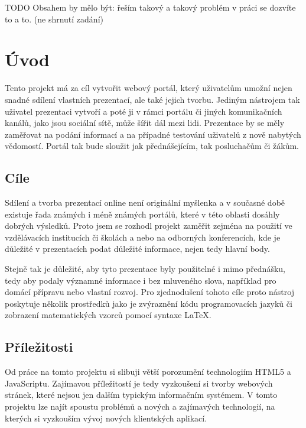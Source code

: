 \documentclass[11pt,twoside,a4paper]{book}
\begin{document}

	\baselineskip

	\noindent
	TODO Obsahem by mělo být: řeším takový a takový problém v práci se dozvíte to a to. (ne shrnutí zadání)

	\tableofcontents		%

	\listoffigures			%

	\mainbodystarts



\chapter{Úvod}
Tento projekt má za cíl vytvořit webový portál, který uživatelům umožní nejen snadné sdílení vlastních prezentací, ale také jejich tvorbu. Jediným nástrojem tak uživatel prezentaci vytvoří a poté ji v rámci portálu či jiných komunikačních kanálů, jako jsou sociální sítě, může šířit dál mezi lidi. Prezentace by se měly zaměřovat na podání informací a na případné testování uživatelů z nově nabytých vědomostí. Portál tak bude sloužit jak přednášejícím, tak posluchačům či žákům.

\section{Cíle}
Sdílení a tvorba prezentací online není originální myšlenka a v současné době existuje řada známých i méně známých portálů, které v této oblasti dosáhly dobrých výsledků. Proto jsem se rozhodl projekt zaměřit zejména na použití ve vzdělávacích institucích či školách a nebo na odborných konferencích, kde je důležité v prezentacích podat důležité informace, nejen tedy hlavní body.

Stejně tak je důležité, aby tyto prezentace byly použitelné i mimo přednášku, tedy aby podaly významné informace i bez mluveného slova, například pro domácí přípravu nebo vlastní rozvoj. Pro zjednodušení tohoto cíle proto nástroj poskytuje několik prostředků jako je zvýraznění kódu programovacích jazyků či zobrazení matematických vzorců pomocí syntaxe \LaTeX.

\section{Příležitosti}
Od práce na tomto projektu si slibuji větší porozumění technologiím HTML5 a JavaScriptu. Zajímavou příležitostí je tedy vyzkoušení si tvorby webových stránek, které nejsou jen dalším typickým informačním systémem. V tomto projektu lze najít spoustu problémů a nových a zajímavých technologií, na kterých si vyzkouším vývoj nových klientských aplikací.
\end{document}
